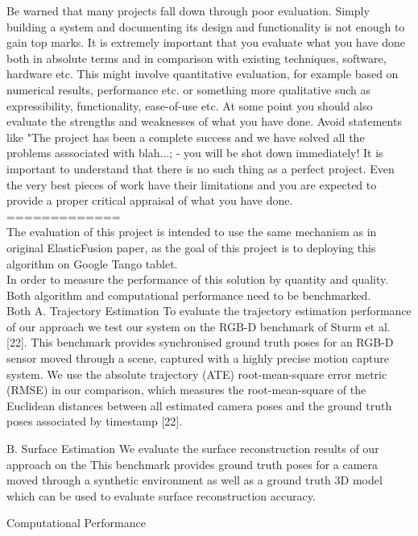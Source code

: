 \documentclass[12pt,twoside]{article}
\begin{document}
Be warned that many projects fall down through poor evaluation. Simply building a system and documenting its design and functionality is not enough to gain top marks. It is extremely important that you evaluate what you have done both in absolute terms and in comparison with existing techniques, software, hardware etc. This might involve quantitative evaluation, for example based on numerical results, performance etc. or something more qualitative such as expressibility, functionality, ease-of-use etc. At some point you should also evaluate the strengths and weaknesses of what you have done. Avoid statements like "The project has been a complete success and we have solved all the problems asssociated with blah...; - you will be shot down immediately! It is important to understand that there is no such thing as a perfect project. Even the very best pieces of work have their limitations and you are expected to provide a proper critical appraisal of what you have done.\\

=============\\


The evaluation of this project is intended to use the same mechanism as in original ElasticFusion\citep{whelan2016elasticfusion} paper, as the goal of this project is to deploying this algorithm on Google Tango tablet.\\
In order to measure the performance of this solution by quantity and quality. Both algorithm and computational performance need to be benchmarked.\\
Both 
A. Trajectory Estimation
To evaluate the trajectory estimation performance of our approach
we test our system on the RGB-D benchmark of Sturm
et al. [22]. This benchmark provides synchronised ground truth
poses for an RGB-D sensor moved through a scene, captured
with a highly precise motion capture system.  We use the absolute
trajectory (ATE) root-mean-square error metric (RMSE) in
our comparison, which measures the root-mean-square of the
Euclidean distances between all estimated camera poses and
the ground truth poses associated by timestamp [22].
 
 
B. Surface Estimation
We evaluate the surface reconstruction results of our approach
on the 
 This
benchmark provides ground truth poses for a camera moved
through a synthetic environment as well as a ground truth 3D
model which can be used to evaluate surface reconstruction
accuracy. 

Computational Performance
\end{document}
